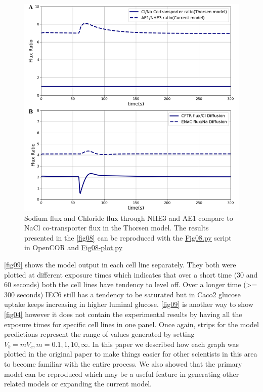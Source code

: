 \documentclass[fleqn,10pt]{physiome}
\begin{document}
\begin{figure}[ht]
\centering
\includegraphics[width=0.75\linewidth]{fig08.png}
\caption{Sodium flux and Chloride flux through NHE3 and AE1 compare to NaCl co-transporter flux in the Thorsen model. The results presented in the \autoref{fig08} can be reproduced with the \href{https://models.physiomeproject.org/workspace/572/file/c052b0c460280139dad150937fbee4fa6a026505/SEDML_files/Fig08.py}{Fig08.py} script in OpenCOR and \href{https://models.physiomeproject.org/workspace/572/file/c052b0c460280139dad150937fbee4fa6a026505/SEDML_files/Fig08_plot.py}{Fig08-plot.py}}
\label{fig08}
\end{figure}\newpage

\autoref{fig09} shows the model output in each cell line separately. They both were plotted at different exposure times which indicates that over a short time (30 and 60 seconds) both the cell lines have tendency to level off. Over a longer time (>= 300 seconds) IEC6 still has a tendency to be saturated but in Caco2 glucose uptake keeps increasing in higher luminal glucose. \autoref{fig09} is another way to show \autoref{fig04} however it does not contain the experimental results by having all the exposure times for specific cell lines in one panel. Once again, strips for the model predictions represent the range of values generated by setting $V_b = m V_c, m = 0.1, 1, 10, \infty$. In this paper we described how each graph was plotted in the original paper to make things easier for other scientists in this area to become familiar with the entire process. We also showed that the primary model can be reproduced which may be a useful feature in generating other related models or expanding the current model.
\end{document}
